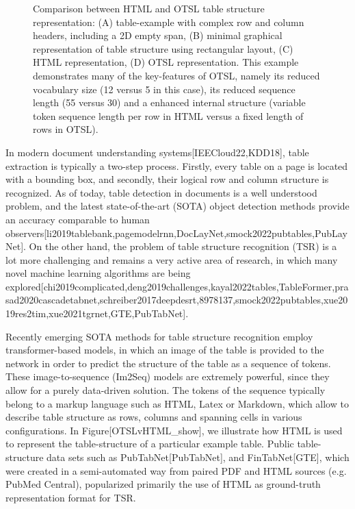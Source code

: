 \documentclass[11pt,a4paper]{article}
\begin{document}
\begin{figure}[h]
\caption{Comparison between HTML and OTSL table structure representation: (A) table-example with complex row and column headers, including a 2D empty span, (B) minimal graphical representation of table structure using rectangular layout, (C) HTML representation, (D) OTSL representation. This example demonstrates many of the key-features of OTSL, namely its reduced vocabulary size (12 versus 5 in this case), its reduced sequence length (55 versus 30) and a enhanced internal structure (variable token sequence length per row in HTML versus a fixed length of rows in OTSL).}
\end{figure}

In modern document understanding systems[IEECloud22,KDD18], table extraction is typically a two-step process. Firstly, every table on a page is located with a bounding box, and secondly, their logical row and column structure is recognized. As of today, table detection in documents is a well understood problem, and the latest state-of-the-art (SOTA) object detection methods provide an accuracy comparable to human observers[li2019tablebank,pagemodelrnn,DocLayNet,smock2022pubtables,PubLayNet]. On the other hand, the problem of table structure recognition (TSR) is a lot more challenging and remains a very active area of research, in which many novel machine learning algorithms are being explored[chi2019complicated,deng2019challenges,kayal2022tables,TableFormer,prasad2020cascadetabnet,schreiber2017deepdesrt,8978137,smock2022pubtables,xue2019res2tim,xue2021tgrnet,GTE,PubTabNet].

Recently emerging SOTA methods for table structure recognition employ transformer-based models, in which an image of the table is provided to the network in order to predict the structure of the table as a sequence of tokens. These image-to-sequence (Im2Seq) models are extremely powerful, since they allow for a purely data-driven solution. The tokens of the sequence typically belong to a markup language such as HTML, Latex or Markdown, which allow to describe table structure as rows, columns and spanning cells in various configurations. In Figure[OTSLvHTML\_show], we illustrate how HTML is used to represent the table-structure of a particular example table. Public table-structure data sets such as PubTabNet[PubTabNet], and FinTabNet[GTE], which were created in a semi-automated way from paired PDF and HTML sources (e.g. PubMed Central), popularized primarily the use of HTML as ground-truth representation format for TSR.
\end{document}
